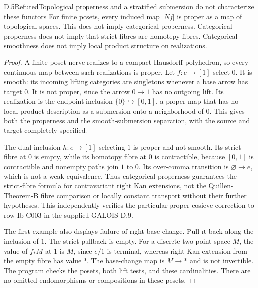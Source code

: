 \begin{statement}{D.5}{Refuted}{Topological properness and a stratified submersion do not characterize these functors}
For finite posets, every induced map $|Nf|$ is proper as a map of topological spaces. This does not imply categorical properness. Categorical properness does not imply that strict fibres are homotopy fibres. Categorical smoothness does not imply local product structure on realizations.
\end{statement}
\begin{proof}
A finite-poset nerve realizes to a compact Hausdorff polyhedron, so every continuous map between such realizations is proper. Let $f:e\to[1]$ select $0$. It is smooth: its incoming lifting categories are singletons whenever a base arrow has target $0$. It is not proper, since the arrow $0\to1$ has no outgoing lift. Its realization is the endpoint inclusion $\{0\}\hookrightarrow[0,1]$, a proper map that has no local product description as a submersion onto a neighborhood of $0$. This gives both the properness and the smooth-submersion separation, with the source and target completely specified.

The dual inclusion $h:e\to[1]$ selecting $1$ is proper and not smooth. Its strict fibre at $0$ is empty, while its homotopy fibre at $0$ is contractible, because $[0,1]$ is contractible and nonempty paths join $1$ to $0$. Its over-comma transition is $\varnothing\to e$, which is not a weak equivalence. Thus categorical properness guarantees the strict-fibre formula for contravariant right Kan extensions, not the Quillen-Theorem-B fibre comparison or locally constant transport without their further hypotheses. This independently verifies the particular proper-cosieve correction to row Ib-C003 in the supplied GALOIS D.9.

The first example also displays failure of right base change. Pull it back along the inclusion of $1$. The strict pullback is empty. For a discrete two-point space $M$, the value of $f_*M$ at $1$ is $M$, since $e/1$ is terminal, whereas right Kan extension from the empty fibre has value $*$. The base-change map is $M\to *$ and is not invertible. The program checks the posets, both lift tests, and these cardinalities. There are no omitted endomorphisms or compositions in these posets.
\end{proof}

